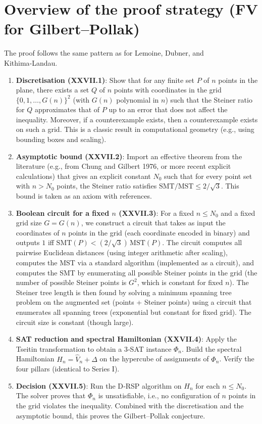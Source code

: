 \documentclass[11pt,a4paper]{article}
\begin{document}
\section{Overview of the proof strategy (FV for Gilbert–Pollak)}

The proof follows the same pattern as for Lemoine, Dubner, and Kithima‑Landau.

\begin{enumerate}
\item \textbf{Discretisation (XXVII.1)}: Show that for any finite set \(P\) of \(n\) points in the plane, there exists a set \(Q\) of \(n\) points with coordinates in the grid \(\{0,1,\dots,G(n)\}^2\) (with \(G(n)\) polynomial in \(n\)) such that the Steiner ratio for \(Q\) approximates that of \(P\) up to an error that does not affect the inequality. Moreover, if a counterexample exists, then a counterexample exists on such a grid. This is a classic result in computational geometry (e.g., using bounding boxes and scaling).
\item \textbf{Asymptotic bound (XXVII.2)}: Import an effective theorem from the literature (e.g., from Chung and Gilbert 1976, or more recent explicit calculations) that gives an explicit constant \(N_0\) such that for every point set with \(n > N_0\) points, the Steiner ratio satisfies \(\text{SMT}/\text{MST} \le 2/\sqrt{3}\). This bound is taken as an axiom with references.
\item \textbf{Boolean circuit for a fixed \(n\) (XXVII.3)}: For a fixed \(n \le N_0\) and a fixed grid size \(G = G(n)\), we construct a circuit that takes as input the coordinates of \(n\) points in the grid (each coordinate encoded in binary) and outputs \(1\) iff \(\text{SMT}(P) < (2/\sqrt{3}) \,\text{MST}(P)\). The circuit computes all pairwise Euclidean distances (using integer arithmetic after scaling), computes the MST via a standard algorithm (implemented as a circuit), and computes the SMT by enumerating all possible Steiner points in the grid (the number of possible Steiner points is \(G^2\), which is constant for fixed \(n\)). The Steiner tree length is then found by solving a minimum spanning tree problem on the augmented set (points + Steiner points) using a circuit that enumerates all spanning trees (exponential but constant for fixed grid). The circuit size is constant (though large).
\item \textbf{SAT reduction and spectral Hamiltonian (XXVII.4)}: Apply the Tseitin transformation to obtain a 3‑SAT instance \(\Phi_n\). Build the spectral Hamiltonian \(H_n = \hat{V}_n + \Delta\) on the hypercube of assignments of \(\Phi_n\). Verify the four pillars (identical to Series I).
\item \textbf{Decision (XXVII.5)}: Run the D‑RSP algorithm on \(H_n\) for each \(n \le N_0\). The solver proves that \(\Phi_n\) is unsatisfiable, i.e., no configuration of \(n\) points in the grid violates the inequality. Combined with the discretisation and the asymptotic bound, this proves the Gilbert–Pollak conjecture.
\end{enumerate}
\end{document}
